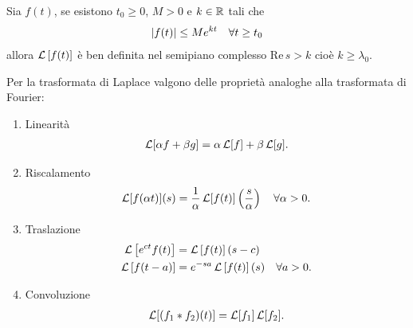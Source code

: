 \begin{theorem}
  Sia $ f(t) $, se esistono $ t_0 \geq 0 $, $ M > 0 $ e $ k \in \mathbb{R} $ tali che 
  \begin{align}
    \left|{f(t)}\right| \leq M e^{kt} \quad \forall t \geq t_0
  \end{align}
  allora $ \operatorname{\mathcal{L}}\left[ f(t) \right] $ è ben definita nel semipiano complesso $ \text{Re} \,s > k $ cioè $ k \geq \lambda_0 $.
\end{theorem}

Per la trasformata di Laplace valgono delle proprietà analoghe alla trasformata di Fourier:
\begin{enumerate}
  \item Linearità
    \begin{align}
      \operatorname{\mathcal{L}}[\alpha f + \beta g] = \alpha \operatorname{\mathcal{L}}[f] + \beta \operatorname{\mathcal{L}}[g].
    \end{align}
  \item Riscalamento
    \begin{align}
      \operatorname{\mathcal{L}}[f(\alpha t)](s) = \frac1\alpha \operatorname{\mathcal{L}}[f(t)]\left( \frac{s}{\alpha} \right) \quad \forall \alpha > 0.
    \end{align}
  \item Traslazione
    \begin{align}
      \operatorname{\mathcal{L}}\left[ e^{ct} f(t) \right] &= \operatorname{\mathcal{L}}\left[ f(t) \right](s - c)
      \\
      \operatorname{\mathcal{L}}\left[ f(t-a) \right] &= e^{-s a} \operatorname{\mathcal{L}}\left[ f(t) \right](s)\quad \forall a > 0.
    \end{align}
  \item Convoluzione
    \begin{align}
      \operatorname{\mathcal{L}}[(f_1 * f_2)(t)] = \operatorname{\mathcal{L}}[f_1] \operatorname{\mathcal{L}}[f_2].
    \end{align}
\end{enumerate}

